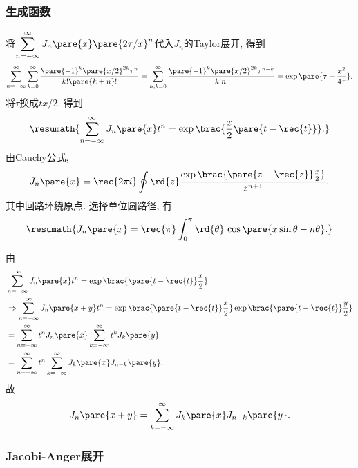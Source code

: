 \documentclass[hidelinks]{ctexart}
\begin{document}
\subsubsection{生成函数} %
\label{ssub:生成函数}

\newpoint{}将$\displaystyle \sum_{n=-\infty}^{\infty} J_n\pare{x} \pare{2\tau/x}^n$代入$J_n$的Taylor展开, 得到
\[ \sum_{n=-\infty}^\infty \sum_{k=0}^\infty \frac{\pare{-1}^k\pare{x/2}^{2k}\tau^n}{k!\pare{k+n}!} = \sum_{n,k = 0}^\infty \frac{\pare{-1}^k \pare{x/2}^{2k}\tau^{n-k}}{k!n!} = \exp\pare{\tau - \frac{x^2}{4\tau}}. \]
将$\tau$换成$tx/2$, 得到
\[ \resumath{\sum_{n=-\infty}^\infty J_n\pare{x}t^n = \exp\brac{\frac{x}{2}\pare{t-\rec{t}}}.} \]
\newpoint{}由Cauchy公式,
\[ J_n\pare{x} = \rec{2\pi i}\oint \rd{z} \frac{\exp\brac{\pare{z-\rec{z}}\frac{x}{2}}}{z^{n+1}}, \]
其中回路环绕原点. 选择单位圆路径, 有
\[ \resumath{J_n\pare{x} = \rec{\pi}\int_0^\pi \rd{\theta}\,\cos\pare{x\sin\theta - n\theta}.} \]
\begin{sample}
    \begin{ex}[加法公式]
        由
        \begin{align*}
            & \sum_{n=-\infty}^{\infty}J_n\pare{x}t^n = \exp\brac{\pare{t-\rec{t}}\frac{x}{2}} \\
            & \Rightarrow \sum_{n=-\infty}^{\infty} J_n\pare{x+y}t^n  = \exp\brac{\pare{t - \rec{t}}\frac{x}{2}} \exp\brac{\pare{t-\rec{t}}\frac{y}{2}} \\
            &= \sum_{n=-\infty}^\infty t^n J_n\pare{x} \sum_{k=-\infty}^\infty t^k J_k\pare{y} \\
            &= \sum_{n=-\infty}^\infty t^n \sum_{k=-\infty}^\infty J_k\pare{x}J_{n-k}\pare{y}.
        \end{align*}
        故
        \[ J_n\pare{x+y} = \sum_{k=-\infty}^\infty J_k\pare{x}J_{n-k}\pare{y}. \]
    \end{ex}
\end{sample}


\subsubsection{Jacobi-Anger展开} %
\label{ssub:jacobi_anger展开}
\end{document}
